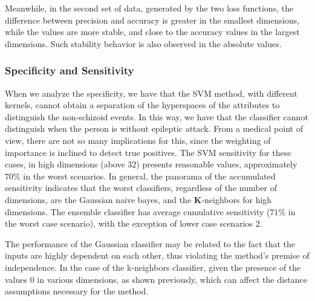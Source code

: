 



Meanwhile, in the second set of data, generated by the two loss functions, the difference between precision and accuracy is greater in the smallest dimensions, while the values are more stable, and close to the accuracy values in the largest dimensions. Such stability behavior is also observed in the absolute values.


\subsubsection{Specificity and Sensitivity}

When we analyze the specificity, we have that the SVM method, with different kernels, cannot obtain a separation of the hyperspaces of the attributes to distinguish the non-schizoid events. In this way, we have that the classifier cannot distinguish when the person is without epileptic attack. From a medical point of view, there are not so many implications for this, since the weighting of importance is inclined to detect true positives. The SVM sensitivity for these cases, in high dimensions (above $ 32 $) presents reasonable values, approximately $70\%$ in the worst scenarios. In general, the panorama of the accumulated sensitivity indicates that the worst classifiers, regardless of the number of dimensions, are the Gaussian naive bayes, and the \textbf{K}-neighbors for high dimensions. The ensemble classifier has average cumulative sensitivity ($ 71 \% $ in the worst case scenario), with the exception of lower case scenarios $ 2 $.

The performance of the Gaussian classifier may be related to the fact that the inputs are highly dependent on each other, thus violating the method's premise of independence. In the case of the k-neighbors classifier, given the presence of the values $ 0 $ in various dimensions, as shown previously, which can affect the distance assumptions necessary for the method.














